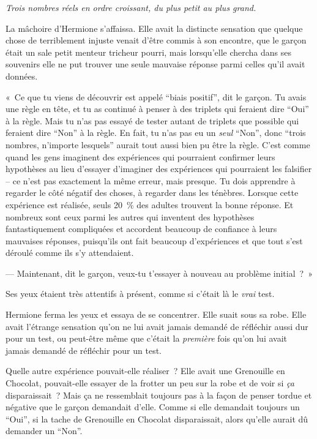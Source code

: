\emph{Trois nombres réels en ordre croissant, du plus petit au plus grand.}

La mâchoire d'Hermione s'affaissa. Elle avait la distincte sensation que quelque chose de terriblement injuste venait d'être commis à son encontre, que le garçon était un sale petit menteur tricheur pourri, mais lorsqu'elle chercha dans ses souvenirs elle ne put trouver une seule mauvaise réponse parmi celles qu'il avait données.

«~Ce que tu viens de découvrir est appelé “biais positif”, dit le garçon. Tu avais une règle en tête, et tu as continué à penser à des triplets qui feraient dire “Oui” à la règle. Mais tu n'as pas essayé de tester autant de triplets que possible qui feraient dire “Non” à la règle. En fait, tu n'as pas eu un \emph{seul} “Non”, donc “trois nombres, n'importe lesquels” aurait tout aussi bien pu être la règle. C'est comme quand les gens imaginent des expériences qui pourraient confirmer leurs hypothèses au lieu d'essayer d'imaginer des expériences qui pourraient les falsifier -- ce n'est pas exactement la même erreur, mais presque. Tu dois apprendre à regarder le côté négatif des choses, à regarder dans les ténèbres. Lorsque cette expérience est réalisée, seuls 20~\% des adultes trouvent la bonne réponse. Et nombreux sont ceux parmi les autres qui inventent des hypothèses fantastiquement compliquées et accordent beaucoup de confiance à leurs mauvaises réponses, puisqu'ils ont fait beaucoup d'expériences et que tout s'est déroulé comme ils s'y attendaient.

--- Maintenant, dit le garçon, veux-tu t'essayer à nouveau au problème initial~?~»

Ses yeux étaient très attentifs à présent, comme si c'était là le \emph{vrai} test.

Hermione ferma les yeux et essaya de se concentrer. Elle suait sous sa robe. Elle avait l'étrange sensation qu'on ne lui avait jamais demandé de réfléchir aussi dur pour un test, ou peut-être même que c'était la \emph{première} fois qu'on lui avait jamais demandé de réfléchir pour un test.

Quelle autre expérience pouvait-elle réaliser~? Elle avait une Grenouille en Chocolat, pouvait-elle essayer de la frotter un peu sur la robe et de voir si \emph{ça} disparaissait~? Mais ça ne ressemblait toujours pas à la façon de penser tordue et négative que le garçon demandait d'elle. Comme si elle demandait toujours un “Oui”, si la tache de Grenouille en Chocolat disparaissait, alors qu'elle aurait dû demander un “Non”.

